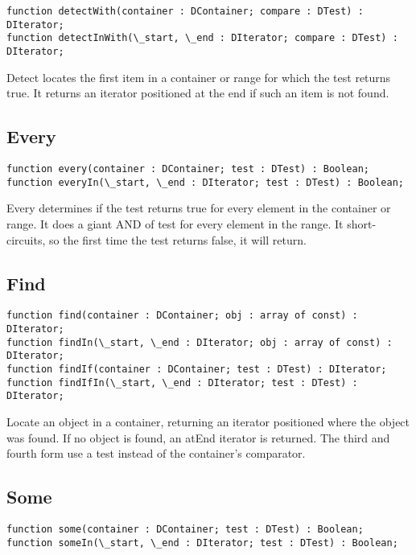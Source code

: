 \documentclass{report}
\begin{document}
\begin{lstlisting}
function detectWith(container : DContainer; compare : DTest) : DIterator;
function detectInWith(\_start, \_end : DIterator; compare : DTest) : DIterator;
\end{lstlisting}

Detect locates the first item in a container or range for which the test
returns true. It returns an iterator positioned at the end if such an item
is not found.

\subsection{Every}

\begin{lstlisting}
function every(container : DContainer; test : DTest) : Boolean;
function everyIn(\_start, \_end : DIterator; test : DTest) : Boolean;
\end{lstlisting}

Every determines if the test returns true for every element in the container
or range. It does a giant AND of test for every element in the range. It
short-circuits, so the first time the test returns false, it will return.

\subsection{Find}

\begin{lstlisting}
function find(container : DContainer; obj : array of const) : DIterator;
function findIn(\_start, \_end : DIterator; obj : array of const) : DIterator;
function findIf(container : DContainer; test : DTest) : DIterator;
function findIfIn(\_start, \_end : DIterator; test : DTest) : DIterator;
\end{lstlisting}

Locate an object in a container, returning an iterator positioned where the
object was found. If no object is found, an atEnd iterator is returned.  The
third and fourth form use a test instead of the container's comparator.

\subsection{Some}

\begin{lstlisting}
function some(container : DContainer; test : DTest) : Boolean;
function someIn(\_start, \_end : DIterator; test : DTest) : Boolean;
\end{lstlisting}
\end{document}
